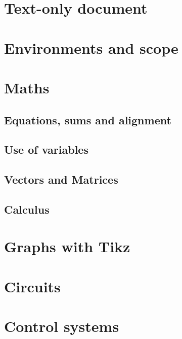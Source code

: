 \section{Text-only document}
\section{Environments and scope}
\section{Maths}
    \subsection{Equations, sums and alignment}
    \subsection{Use of variables} %
    \subsection{Vectors and Matrices}
    \subsection{Calculus}
\section{Graphs with Tikz}
\section{Circuits}
\section{Control systems}
